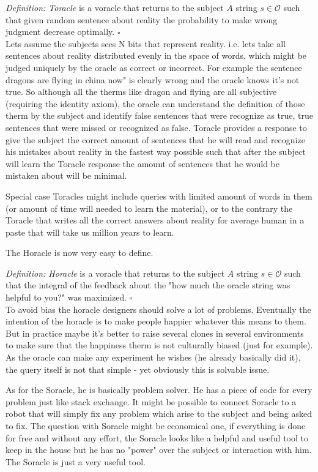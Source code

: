 \documentclass{article}
\begin{document}
\textit{Definition: Toracle} is a voracle that returns to the subject $A$ string  $s \in \mathcal{O}$ such that given random sentence about reality the probability to make wrong judgment decrease optimally. $\square$ \\

Lets assume the subjects sees N bits that represent reality. i.e. lets take all sentences about reality distributed evenly in the space of words, which might be judged uniquely by the oracle as correct or incorrect. For example the sentence dragons are flying in china now" is clearly wrong and the oracle knows it's not true. So although all the therms like dragon and flying are all subjective (requiring the identity axiom), the oracle can understand the definition of those therm by the subject and identify false sentences that were recognize as true, true sentences that were missed or recognized as false. Toracle provides a response to give the subject the correct amount of sentences that he will read and recognize his mistakes about reality in the fastest way possible such that after the subject will learn the Toracle response the amount of sentences that he would be mistaken about will be minimal. 

Special case Toracles might include queries with limited amount of words in them (or amount of time will needed to learn the material), or to the contrary the Toracle that writes all the correct answers about reality for average human in a paste that will take us million years to learn. 

The Horacle is now very easy to define. 

\textit{Definition: Horacle} is a voracle that returns to the subject $A$ string  $s \in \mathcal{O}$ such that the integral of the feedback about the "how much the oracle string was helpful to you?" was maximized. $\square$ \\

To avoid bias the horacle designers should solve a lot of problems. Eventually the intention of the horacle is to make people happier whatever this means to them. But in practice maybe it's better to raise several clones in several environments to make sure that the happiness therm is not culturally biased (just for example). As the oracle can make any experiment he wishes (he already basically did it), the query itself is not that simple - yet obviously this is solvable issue. 

As for the Soracle, he is basically problem solver. He has a piece of code for every problem just like stack exchange. It might be possible to connect Soracle to a robot that will simply fix any problem which arise to the subject and being asked to fix. The question with Soracle might be economical one, if everything is done for free and without any effort, the Soracle looks like a helpful and useful tool to keep in the house but he has no "power" over the subject or interaction with him. The Soracle is just a very useful tool. 
\end{document}
